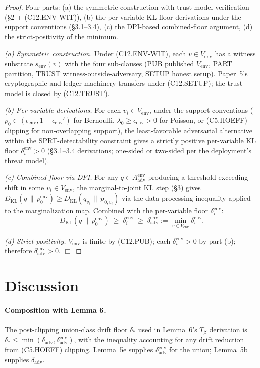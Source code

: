 \documentclass{article}
\newcommand{\Aadv}{A_{\mathrm{adv}}}
\newcommand{\deltaadv}{\delta_{\mathrm{adv}}}
\newcommand{\deltastar}{\delta_{*}}
\newcommand{\Tbeta}{T_{\beta}}
\newcommand{\Vem}{V_{\mathrm{env}}}
\newcommand{\eenv}{\epsilon_{\mathrm{env}}}
\begin{document}
\begin{proof}
Four parts: (a) the symmetric construction with trust-model
verification (§2 + (C12.ENV-WIT)), (b) the per-variable KL floor
derivations under the support conventions (§3.1--3.4), (c) the
DPI-based combined-floor argument, (d) the strict-positivity of
the minimum.

\emph{(a) Symmetric construction.}  Under (C12.ENV-WIT), each
$v \in \Vem$ has a witness substrate $s_{\mathrm{env}}(v)$ with
the four sub-clauses (PUB published $\Vem$, PART partition,
TRUST witness-outside-adversary, SETUP honest setup).  Paper~5's
cryptographic and ledger machinery transfers under (C12.SETUP);
the trust model is closed by (C12.TRUST).

\emph{(b) Per-variable derivations.}  For each $v_i \in \Vem$,
under the support conventions ($p_0 \in (\eenv, 1 - \eenv')$ for
Bernoulli, $\lambda_0 \geq \eenv > 0$ for Poisson, or (C5.HOEFF)
clipping for non-overlapping support), the least-favorable
adversarial alternative within the SPRT-detectability constraint
gives a strictly positive per-variable KL floor
$\delta_i^{\mathrm{env}} > 0$ (§3.1--3.4 derivations; one-sided or
two-sided per the deployment's threat model).

\emph{(c) Combined-floor via DPI.}  For any $q \in
\Aadv^{\mathrm{env}}$ producing a threshold-exceeding shift in some
$v_i \in \Vem$, the marginal-to-joint KL step (§3) gives
$D_{\mathrm{KL}}(q \,\|\, p_0^{\mathrm{env}}) \geq
D_{\mathrm{KL}}(q_{v_i} \,\|\, p_{0, v_i})$ via the data-processing
inequality applied to the marginalization map.  Combined with the
per-variable floor $\delta_i^{\mathrm{env}}$:
\[
  D_{\mathrm{KL}}(q \,\|\, p_0^{\mathrm{env}}) \;\geq\;
  \delta_i^{\mathrm{env}} \;\geq\; \deltaadv^{\mathrm{env}} :=
  \min_{v \in \Vem} \delta_v^{\mathrm{env}}.
\]

\emph{(d) Strict positivity.}  $\Vem$ is finite by (C12.PUB);
each $\delta_v^{\mathrm{env}} > 0$ by part (b); therefore
$\deltaadv^{\mathrm{env}} > 0$.  $\Box$
\end{proof}

\section{Discussion}

\paragraph{Composition with Lemma 6.}  The post-clipping union-class
drift floor $\deltastar$ used in Lemma~6's $\Tbeta$ derivation is
$\deltastar \leq \min(\deltaadv, \deltaadv^{\mathrm{env}})$, with
the inequality accounting for any drift reduction from (C5.HOEFF)
clipping.  Lemma~5e supplies $\deltaadv^{\mathrm{env}}$ for the
union; Lemma~5b supplies $\deltaadv$.
\end{document}
